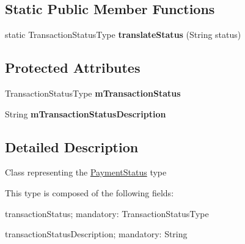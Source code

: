 \subsection*{Static Public Member Functions}
\begin{DoxyCompactItemize}
\item 
\hypertarget{classcom_1_1bluevia_1_1payment_1_1data_1_1PaymentStatus_abc30878251fc7b02570cecb76d190e7b}{
static TransactionStatusType {\bfseries translateStatus} (String status)}
\label{classcom_1_1bluevia_1_1payment_1_1data_1_1PaymentStatus_abc30878251fc7b02570cecb76d190e7b}

\end{DoxyCompactItemize}
\subsection*{Protected Attributes}
\begin{DoxyCompactItemize}
\item 
\hypertarget{classcom_1_1bluevia_1_1payment_1_1data_1_1PaymentStatus_ada38881f8abc1b2ba3c157bd0fa0afe8}{
TransactionStatusType {\bfseries mTransactionStatus}}
\label{classcom_1_1bluevia_1_1payment_1_1data_1_1PaymentStatus_ada38881f8abc1b2ba3c157bd0fa0afe8}

\item 
\hypertarget{classcom_1_1bluevia_1_1payment_1_1data_1_1PaymentStatus_a874439515618a53ef47462c6764e3d17}{
String {\bfseries mTransactionStatusDescription}}
\label{classcom_1_1bluevia_1_1payment_1_1data_1_1PaymentStatus_a874439515618a53ef47462c6764e3d17}

\end{DoxyCompactItemize}


\subsection{Detailed Description}
Class representing the \hyperlink{classcom_1_1bluevia_1_1payment_1_1data_1_1PaymentStatus}{PaymentStatus} type

This type is composed of the following fields: 
\begin{DoxyItemize}
\item transactionStatus; mandatory: TransactionStatusType 
\item transactionStatusDescription; mandatory: String 
\end{DoxyItemize}

